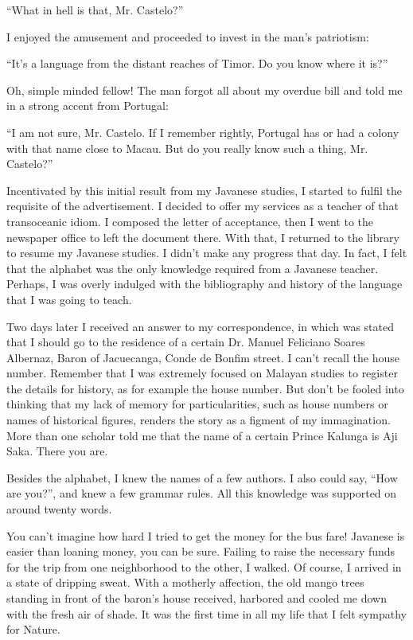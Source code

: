 \documentclass[a4paper,12pt]{book}
\begin{document}
``What in hell is that, Mr. Castelo?''

I enjoyed the amusement
and proceeded to invest
in the man's patriotism:

``It's a language from the distant reaches of Timor.
Do you know where it is?''

Oh, simple minded fellow! The man forgot all about
my overdue bill and told me in a strong accent
from Portugal:

``I am not sure, Mr. Castelo. If I remember rightly,
Portugal has or had a colony with that name
close to Macau. But do you
really know such a thing, Mr. Castelo?''

Incentivated by this initial result from
my Javanese studies,
I started to fulfil the requisite of the advertisement.
I decided to offer my services as a teacher of
that transoceanic idiom. I composed the letter of
acceptance, then I went to the newspaper
office to left the document there.
With that, I returned
to the library to resume my Javanese studies.
I didn't make any progress that day. In fact, I
felt that the alphabet was the only knowledge
required from a Javanese teacher. Perhaps,
I was overly indulged with the
bibliography and history of the
language that I was going to teach.

Two days later I received an answer to my correspondence,
in which was stated
that I should go to the residence of
a certain Dr. Manuel Feliciano Soares Albernaz,
Baron of Jacuecanga,
Conde de Bonfim street.
I can't recall the house
number. Remember that  I was extremely focused
on Malayan studies to register the details
for history, as for example the house number.
But don't be fooled into thinking that
my lack of memory for particularities,
such as house numbers or names of historical
figures, renders the story as a figment
of my immagination. More than one scholar
told me that the  name of a certain
Prince Kalunga 
is Aji Saka. 
There you are.

Besides the alphabet, I knew the names
of a few authors. I also could say, ``How are
you?'', and knew a few grammar rules.
All this knowledge was supported
on around twenty words.

You can't imagine how hard I tried
to get the money for the bus fare! Javanese
is easier than loaning money,
you can be sure. Failing to raise
the necessary funds for the trip from
one neighborhood to the other, I walked.
Of course, I arrived in a state of dripping sweat.
With a motherly
affection, the old
mango trees standing in front
of the baron's house received, harbored
and cooled me down with the fresh air of shade.
It was the first time in all my life
that I felt sympathy for Nature.
\end{document}
